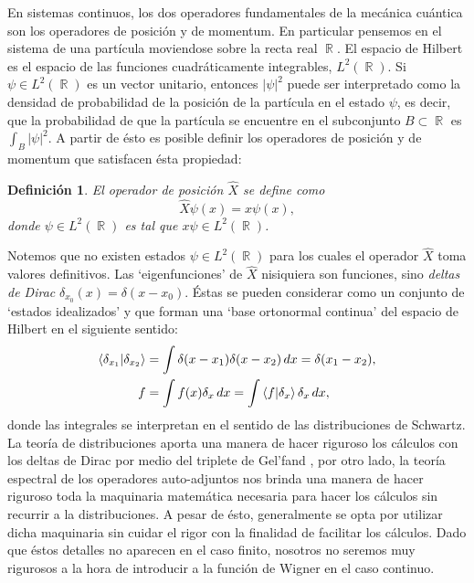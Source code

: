 \documentclass[a4paper]{report}
\DeclareMathOperator{\R}{\mathbb{R}}
\newtheorem{definition}{Definición}
\begin{document}
  En sistemas continuos, los dos operadores fundamentales de
  la mecánica cuántica son los operadores de posición y de
  momentum. En particular pensemos en el sistema de una
  partícula moviendose sobre la recta real $\R$. El espacio
  de Hilbert es el espacio de las funciones cuadráticamente
  integrables, $L^2(\R)$. Si $\psi \in L^2(\R)$ es un vector
  unitario, entonces $|\psi|^2$ puede ser interpretado como
  la densidad de probabilidad de la posición de la partícula
  en el estado $\psi$, es decir, que la probabilidad de que
  la partícula se encuentre en el subconjunto $B \subset \R$
  es $\int_B |\psi|^2$. A partir de ésto es posible definir
  los operadores de posición y de momentum que satisfacen
  ésta propiedad:
  \begin{definition}
    El operador de posición $\hat X$ se define como
    \[
      \hat X\psi(x) = x\psi(x),
    \] 
    donde $\psi \in L^2(\R)$ es tal que $x\psi \in L^2(\R)$.
  \end{definition}
  Notemos que no existen estados $\psi \in L^2(\R)$ para los
  cuales el operador $\hat X$ toma valores definitivos. Las
  `eigenfunciones' de $\hat X$ nisiquiera son funciones,
  sino \textit{deltas de Dirac} $\delta_{x_0}(x) = \delta(x
  - x_0)$. Éstas se pueden considerar como un conjunto de
  `estados idealizados' y que forman una `base ortonormal
  continua' del espacio de Hilbert en el siguiente sentido:
  \begin{align*}
    \braket{\delta_{x_1}|\delta_{x_2}}
    &= \int \delta(x-x_1)\delta(x-x_2) \, dx
    = \delta(x_1-x_2), \\
    f
    &= \int f(x)\delta_x \, dx
    = \int \braket{f| \delta_x}\delta_x \, dx,
  \end{align*} 
  donde las integrales se interpretan en el sentido de las
  distribuciones de Schwartz. La teoría de distribuciones
  aporta una manera de hacer riguroso los cálculos con los
  deltas de Dirac por medio del triplete de Gel'fand
  \cite{folland1989}, por otro lado, la teoría espectral de
  los operadores auto-adjuntos nos brinda una manera de
  hacer riguroso toda la maquinaria matemática necesaria
  para hacer los cálculos sin recurrir a la distribuciones.
  A pesar de ésto, generalmente se opta por utilizar dicha
  maquinaria sin cuidar el rigor con la finalidad de
  facilitar los cálculos. Dado que éstos detalles no
  aparecen en el caso finito, nosotros no seremos muy
  rigurosos a la hora de introducir a la función de Wigner
  en el caso continuo.
\end{document}
